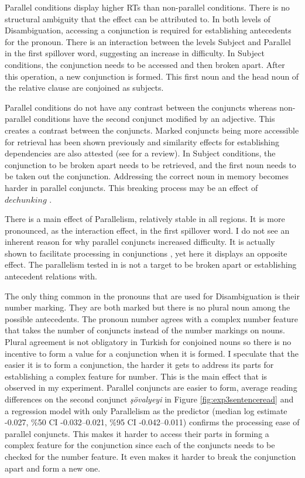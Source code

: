 Parallel conditions display higher RTs than non-parallel conditions. There is no structural ambiguity that the effect can be attributed to. In both levels of Disambiguation, accessing a conjunction is required for establishing antecedents for the pronoun. There is an interaction between the levels Subject and Parallel in the first spillover word, suggesting an increase in difficulty. In Subject conditions, the conjunction needs to be accessed and then broken apart. After this operation, a new conjunction is formed. This first noun and the head noun of the relative clause are conjoined as subjects.

Parallel conditions do not have any contrast between the conjuncts whereas non-parallel conditions have the second conjunct modified by an adjective. This creates a contrast between the conjuncts. Marked conjuncts being more accessible for retrieval has been shown previously \citep{Hofmeister2014} and similarity effects for establishing dependencies are also attested (see \citet{Jager2017} for a review). In Subject conditions, the conjunction to be broken apart needs to be retrieved, and the first noun needs to be taken out the conjunction. Addressing the correct noun in memory becomes harder in parallel conjuncts. This breaking process may be an effect of $dechunking$ \citet{martin2011direct}.

There is a main effect of Parallelism, relatively stable in all regions. It is more pronounced, as the interaction effect, in the first spillover word. I do not see an inherent reason for why parallel conjuncts increased difficulty. It is actually shown to facilitate processing in conjunctions \citep{frazier2000processing}, yet here it displays an opposite effect. The parallelism tested in \citep{frazier2000processing} is not a target to be broken apart or establishing antecedent relations with. 

The only thing common in the pronouns that are used for Disambiguation is their number marking. They are both marked {\Pl} but there is no plural noun among the possible antecedents. The pronoun number agrees with a complex number feature that takes the number of conjuncts instead of the number markings on nouns. Plural agreement is not obligatory in Turkish for conjoined nouns so there is no incentive to form a {\Pl} value for a conjunction when it is formed. I speculate that the easier it is to form a conjunction, the harder it gets to address its parts for establishing a complex feature for number. This is the main effect that is observed in my experiment. Parallel conjuncts are easier to form, average reading differences on the second conjunct \textit{şövalyeyi} in Figure \ref{fig:exp3sentenceread} and a regression model with only Parallelism as the predictor (median log estimate -0.027, \%50 CI -0.032--0.021, \%95 CI -0.042--0.011) confirms the processing ease of parallel conjuncts. This makes it harder to access their parts in forming a complex feature for the conjunction since each of the conjuncts needs to be checked for the number feature. It even makes it harder to break the conjunction apart and form a new one.


